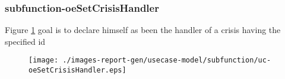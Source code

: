 \subsubsection{subfunction-oeSetCrisisHandler}

\label{RE-use-case-oeSetCrisisHandler}


Figure \ref{fig:lu.uni.lassy.excalibur.myproject-RE-UCD-uc-oeSetCrisisHandler}
goal is to declare himself as been the handler of a crisis having the specified id

\begin{figure}[htbp]
\begin{center}

\texttt{[image: ./images-report-gen/usecase-model/subfunction/uc-oeSetCrisisHandler.eps]}
\end{center}
\caption[lu.uni.lassy.excalibur.myproject Use Case Diagram: uc-oeSetCrisisHandler]{}
\label{fig:lu.uni.lassy.excalibur.myproject-RE-UCD-uc-oeSetCrisisHandler}
\end{figure}
\vspace{0.5cm}
